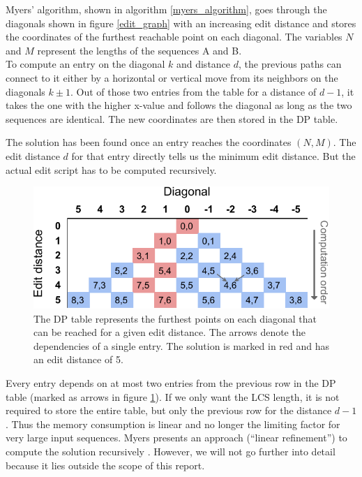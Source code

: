 Myers' algorithm, shown in algorithm \ref{myers_algorithm}, goes through the diagonals shown in figure \ref{edit_graph} with an increasing edit distance and stores the coordinates of the furthest reachable point on each diagonal. The variables $N$ and $M$ represent the lengths of the sequences A and B.\\
To compute an entry on the diagonal $k$ and distance $d$, the previous paths can connect to it either by a horizontal or vertical move from its neighbors on the diagonals $k \pm 1$. Out of those two entries from the table for a distance of $d-1$, it takes the one with the higher x-value and follows the diagonal as long as the two sequences are identical. The new coordinates are then stored in the DP table.

The solution has been found once an entry reaches the coordinates $(N,M)$. The edit distance $d$ for that entry directly tells us the minimum edit distance. But the actual edit script has to be computed recursively.

\begin{figure}[hbt]\centering
  \includegraphics[width=0.95\linewidth]{images/dp_table.pdf}
  \caption{The DP table represents the furthest points on each diagonal that can be reached for a given edit distance. The arrows denote the dependencies of a single entry. The solution is marked in red and has an edit distance of 5.}
  \label{dp_table}
\end{figure}

Every entry depends on at most two entries from the previous row in the DP table (marked as arrows in figure \ref{dp_table}). If we only want the LCS length, it is not required to store the entire table, but only the previous row for the distance $d-1$. Thus the memory consumption is linear and no longer the limiting factor for very large input sequences. Myers presents an approach (``linear refinement'') to compute the solution recursively \cite{myers_anond_1986}. However, we will not go further into detail because it lies outside the scope of this report.
